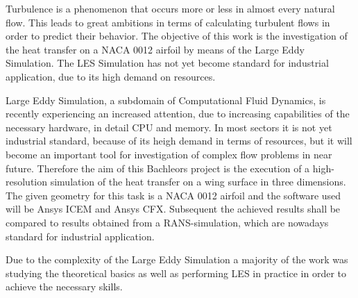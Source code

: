 Turbulence is a phenomenon that occurs more or less in almost every natural flow. 
This leads to great ambitions in terms of calculating turbulent flows in order to predict their behavior.
The objective of this work is the investigation of the heat transfer on a NACA 0012 airfoil by means of the Large Eddy Simulation.
The LES Simulation has not yet become standard for industrial application, due to its high demand on resources.

Large Eddy Simulation, a subdomain of Computational Fluid Dynamics, is recently experiencing an increased attention, due to increasing capabilities of the necessary hardware, in detail CPU and memory. In most sectors it is not yet industrial standard, because of its heigh demand in terms of resources, but it will become an important tool for investigation of complex flow problems in near future. Therefore the aim of this Bachleors project is the execution of a high-resolution simulation of the heat transfer on a wing surface in three dimensions. The given geometry for this task is a NACA 0012 airfoil and the software used will be Ansys ICEM and Ansys CFX. Subsequent the achieved results shall be compared to results obtained from a RANS-simulation, which are nowadays standard for industrial application.

Due to the complexity of the Large Eddy Simulation a majority of the work was studying the theoretical basics as well as performing LES in practice in order to achieve the necessary skills.